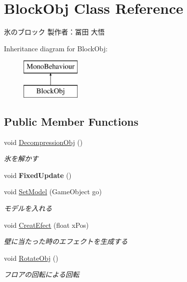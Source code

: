 \hypertarget{class_block_obj}{}\section{Block\+Obj Class Reference}
\label{class_block_obj}


氷のブロック 製作者：冨田 大悟  


Inheritance diagram for Block\+Obj\+:\begin{figure}[H]
\begin{center}
\leavevmode
\includegraphics[height=2.000000cm]{class_block_obj}
\end{center}
\end{figure}
\subsection*{Public Member Functions}
\begin{DoxyCompactItemize}
\item 
void \hyperlink{class_block_obj_a87bfddc5f6ec30cdc03f4a68483550db}{Decompression\+Obj} ()
\begin{DoxyCompactList}\small\item\em 氷を解かす \end{DoxyCompactList}\item 
\mbox{\label{class_block_obj_a58c56e04b05dc5419055861f7931ad84}} 
void {\bfseries Fixed\+Update} ()
\item 
void \hyperlink{class_block_obj_aad93ec540443ca232004e80ee38e6406}{Set\+Model} (Game\+Object go)
\begin{DoxyCompactList}\small\item\em モデルを入れる \end{DoxyCompactList}\item 
void \hyperlink{class_block_obj_aed25d6e080bf90d5375c8c9807584f8d}{Creat\+Efect} (float x\+Pos)
\begin{DoxyCompactList}\small\item\em 壁に当たった時のエフェクトを生成する \end{DoxyCompactList}\item 
void \hyperlink{class_block_obj_ae180e4e29771bf016cda61d51c832da0}{Rotate\+Obj} ()
\begin{DoxyCompactList}\small\item\em フロアの回転による回転 \end{DoxyCompactList}\end{DoxyCompactItemize}
